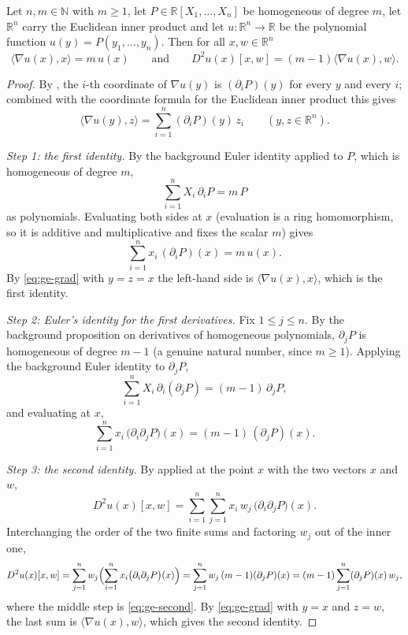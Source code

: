 \begin{lemma}
Let $n,m\in\mathbb{N}$ with $m\ge1$, let $P\in\mathbb{R}[X_1,\dots,X_n]$ be
homogeneous of degree $m$, let $\mathbb{R}^n$ carry the Euclidean inner product
and let $u:\mathbb{R}^n\to\mathbb{R}$ be the polynomial function
$u(y)=P(y_1,\dots,y_n)$. Then for all $x,w\in\mathbb{R}^n$
\[
  \bigl\langle\nabla u(x),x\bigr\rangle=m\,u(x)
  \qquad\text{and}\qquad
  D^2u(x)[x,w]=(m-1)\bigl\langle\nabla u(x),w\bigr\rangle .
\]
\end{lemma}
\begin{proof}
By , the $i$-th coordinate of $\nabla u(y)$ is
$(\partial_iP)(y)$ for every $y$ and every $i$; combined with the coordinate
formula for the Euclidean inner product this gives
\begin{equation}\label{eq:ge-grad}
  \bigl\langle\nabla u(y),z\bigr\rangle=\sum_{i=1}^{n}(\partial_iP)(y)\,z_i
  \qquad(y,z\in\mathbb{R}^n).
\end{equation}

\emph{Step 1: the first identity.} By the background Euler identity applied to
$P$, which is homogeneous of degree $m$,
\[
  \sum_{i=1}^{n}X_i\,\partial_iP=m\,P
\]
as polynomials. Evaluating both sides at $x$ (evaluation is a ring homomorphism,
so it is additive and multiplicative and fixes the scalar $m$) gives
\[
  \sum_{i=1}^{n}x_i\,(\partial_iP)(x)=m\,u(x).
\]
By \eqref{eq:ge-grad} with $y=z=x$ the left-hand side is
$\langle\nabla u(x),x\rangle$, which is the first identity.

\emph{Step 2: Euler's identity for the first derivatives.} Fix $1\le j\le n$. By
the background proposition on derivatives of homogeneous polynomials,
$\partial_jP$ is homogeneous of degree $m-1$ (a genuine natural number, since
$m\ge1$). Applying the background Euler identity to $\partial_jP$,
\[
  \sum_{i=1}^{n}X_i\,\partial_i(\partial_jP)=(m-1)\,\partial_jP ,
\]
and evaluating at $x$,
\begin{equation}\label{eq:ge-second}
  \sum_{i=1}^{n}x_i\,\bigl(\partial_i\partial_jP\bigr)(x)
  =(m-1)\,(\partial_jP)(x).
\end{equation}

\emph{Step 3: the second identity.} By  applied at the
point $x$ with the two vectors $x$ and $w$,
\[
  D^2u(x)[x,w]
  =\sum_{i=1}^{n}\sum_{j=1}^{n}x_i\,w_j\,\bigl(\partial_i\partial_jP\bigr)(x).
\]
Interchanging the order of the two finite sums and factoring $w_j$ out of the
inner one,
\[
  D^2u(x)[x,w]
  =\sum_{j=1}^{n}w_j\Bigl(\sum_{i=1}^{n}x_i\bigl(\partial_i\partial_jP\bigr)(x)\Bigr)
  =\sum_{j=1}^{n}w_j\,(m-1)(\partial_jP)(x)
  =(m-1)\sum_{j=1}^{n}(\partial_jP)(x)\,w_j ,
\]
where the middle step is \eqref{eq:ge-second}. By \eqref{eq:ge-grad} with $y=x$
and $z=w$, the last sum is $\langle\nabla u(x),w\rangle$, which gives the second
identity.
\end{proof}
